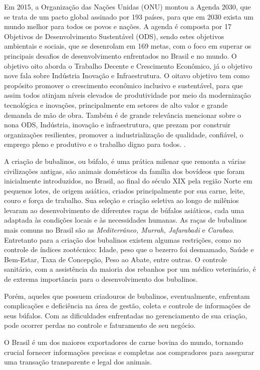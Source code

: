 Em 2015, a Organização das Nações Unidas (ONU) montou a Agenda 2030, que se trata de um pacto global assinado por 193 países, para que em 2030 exista um mundo melhor para todos os povos e nações. A agenda é composta por 17 Objetivos de Desenvolvimento Sustentável (ODS), sendo estes objetivos ambientais e sociais, que se desenrolam em 169 metas, com o foco em superar os principais desafios de desenvolvimento enfrentados no Brasil e no mundo. O objetivo oito aborda o Trabalho Decente e Crescimento Econômico, já o objetivo nove fala sobre Indústria Inovação e Infraestrutura. O oitavo objetivo tem como propósito promover o crescimento econômico inclusivo e sustentável, para que assim todos atinjam níveis elevados de produtividade por meio da modernização tecnológica e inovações, principalmente em setores de alto valor e grande demanda de mão de obra. Também é de grande relevância mencionar sobre o nona ODS, Indústria, inovação e infraestrutura, que prezam por construir organizações resilientes, promover a industrialização de qualidade, confiável, o emprego pleno e produtivo e o trabalho digno para todos. \cite{onu}.

A criação de bubalinos, ou búfalo, é uma prática milenar que remonta a várias civilizações antigas, são animais domésticos da família dos bovídeos que foram  inicialmente introduzidos, no Brasil, ao final do século XIX pela região Norte em pequenos lotes, de origem asiática, criados principalmente por sua carne, leite, couro e força de trabalho. Sua  seleção e criação seletiva ao longo de milênios levaram ao desenvolvimento de diferentes raças de búfalos asiáticos, cada uma adaptada às condições locais e às necessidades humanas. As raças de bubalinos mais comuns no Brasil são as \textit{Mediterrâneo, Murrah, Jafarabadi} e \textit{Carabao}. Entretanto para a criação dos bubalinos existem algumas restrições, como no controle de índices zootécnico: Idade, peso que o bezerro foi desmamado, Saúde e Bem-Estar, Taxa de Concepção, Peso ao Abate, entre outras.  O controle sanitário, com a assistência da maioria dos rebanhos por um médico veterinário, é de extrema importância para o desenvolvimento dos bubalinos. \cite{Correa.G}
  
Porém, aqueles que possuem criadouros de bubalinos, eventualmente, enfrentam complicações e deficiência na área de gestão, coleta e controle de informações de seus búfalos. Com as dificuldades enfrentadas no gerenciamento de sua criação, pode ocorrer perdas no controle e faturamento de seu negócio.

O Brasil é um dos maiores exportadores de carne bovina do mundo, tornando crucial fornecer informações precisas e completas aos compradores para assegurar uma transação transparente e legal dos animais.  

